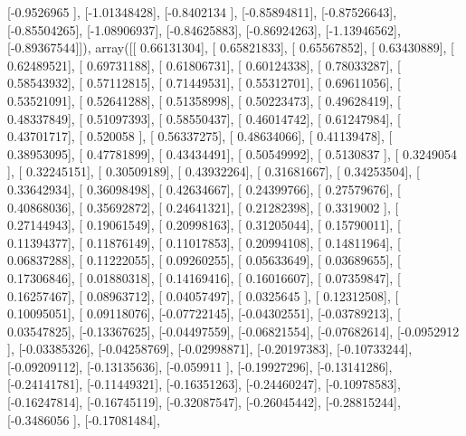 \documentclass{article}
\begin{document}
       [-0.9526965 ],
       [-1.01348428],
       [-0.8402134 ],
       [-0.85894811],
       [-0.87526643],
       [-0.85504265],
       [-1.08906937],
       [-0.84625883],
       [-0.86924263],
       [-1.13946562],
       [-0.89367544]]), array([[ 0.66131304],
       [ 0.65821833],
       [ 0.65567852],
       [ 0.63430889],
       [ 0.62489521],
       [ 0.69731188],
       [ 0.61806731],
       [ 0.60124338],
       [ 0.78033287],
       [ 0.58543932],
       [ 0.57112815],
       [ 0.71449531],
       [ 0.55312701],
       [ 0.69611056],
       [ 0.53521091],
       [ 0.52641288],
       [ 0.51358998],
       [ 0.50223473],
       [ 0.49628419],
       [ 0.48337849],
       [ 0.51097393],
       [ 0.58550437],
       [ 0.46014742],
       [ 0.61247984],
       [ 0.43701717],
       [ 0.520058  ],
       [ 0.56337275],
       [ 0.48634066],
       [ 0.41139478],
       [ 0.38953095],
       [ 0.47781899],
       [ 0.43434491],
       [ 0.50549992],
       [ 0.5130837 ],
       [ 0.3249054 ],
       [ 0.32245151],
       [ 0.30509189],
       [ 0.43932264],
       [ 0.31681667],
       [ 0.34253504],
       [ 0.33642934],
       [ 0.36098498],
       [ 0.42634667],
       [ 0.24399766],
       [ 0.27579676],
       [ 0.40868036],
       [ 0.35692872],
       [ 0.24641321],
       [ 0.21282398],
       [ 0.3319002 ],
       [ 0.27144943],
       [ 0.19061549],
       [ 0.20998163],
       [ 0.31205044],
       [ 0.15790011],
       [ 0.11394377],
       [ 0.11876149],
       [ 0.11017853],
       [ 0.20994108],
       [ 0.14811964],
       [ 0.06837288],
       [ 0.11222055],
       [ 0.09260255],
       [ 0.05633649],
       [ 0.03689655],
       [ 0.17306846],
       [ 0.01880318],
       [ 0.14169416],
       [ 0.16016607],
       [ 0.07359847],
       [ 0.16257467],
       [ 0.08963712],
       [ 0.04057497],
       [ 0.0325645 ],
       [ 0.12312508],
       [ 0.10095051],
       [ 0.09118076],
       [-0.07722145],
       [-0.04302551],
       [-0.03789213],
       [ 0.03547825],
       [-0.13367625],
       [-0.04497559],
       [-0.06821554],
       [-0.07682614],
       [-0.0952912 ],
       [-0.03385326],
       [-0.04258769],
       [-0.02998871],
       [-0.20197383],
       [-0.10733244],
       [-0.09209112],
       [-0.13135636],
       [-0.059911  ],
       [-0.19927296],
       [-0.13141286],
       [-0.24141781],
       [-0.11449321],
       [-0.16351263],
       [-0.24460247],
       [-0.10978583],
       [-0.16247814],
       [-0.16745119],
       [-0.32087547],
       [-0.26045442],
       [-0.28815244],
       [-0.3486056 ],
       [-0.17081484],
\end{document}
